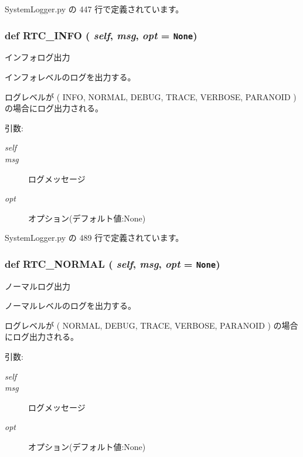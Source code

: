  SystemLogger.py の 447 行で定義されています。
\subsubsection{\setlength{\rightskip}{0pt plus 5cm}def RTC\_\-INFO ( {\em self},  {\em msg},  {\em opt} = {\tt None})}\label{classsource__py_1_1_system_logger_1_1_log_stream_09e7e09869e9ea78f2dbd6915eb5937a}


インフォログ出力 

インフォレベルのログを出力する。\par
ログレベルが ( INFO, NORMAL, DEBUG, TRACE, VERBOSE, PARANOID ) の場合にログ出力される。

\begin{Desc}
\item[引数:]
\begin{description}
\item[{\em self}]\item[{\em msg}]ログメッセージ \item[{\em opt}]オプション(デフォルト値:None) \end{description}
\end{Desc}


 SystemLogger.py の 489 行で定義されています。
\subsubsection{\setlength{\rightskip}{0pt plus 5cm}def RTC\_\-NORMAL ( {\em self},  {\em msg},  {\em opt} = {\tt None})}\label{classsource__py_1_1_system_logger_1_1_log_stream_5d62f2b6b0fb50497317cd4830842b8e}


ノーマルログ出力 

ノーマルレベルのログを出力する。\par
ログレベルが ( NORMAL, DEBUG, TRACE, VERBOSE, PARANOID ) の場合にログ出力される。

\begin{Desc}
\item[引数:]
\begin{description}
\item[{\em self}]\item[{\em msg}]ログメッセージ \item[{\em opt}]オプション(デフォルト値:None) \end{description}
\end{Desc}


